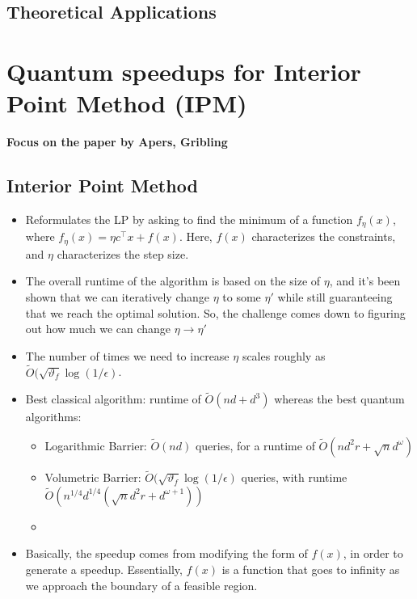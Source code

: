 \documentclass[10pt]{article}
\renewcommand{\tilde}{\widetilde}
\begin{document}
	\subsection{Theoretical Applications} 

	\section{Quantum speedups for Interior Point Method (IPM)}
	\textbf{Focus on the paper by Apers, Gribling}
	\subsection{Interior Point Method}
	\begin{itemize}
		\item Reformulates the LP by asking to find the minimum of a function \( f_{\eta}(x)  \), where 
			\( f_{\eta}(x) = \eta c^{\top}x + f(x)  \). Here, \( f(x) \) characterizes the constraints, and 
			\( \eta \) characterizes the step size. 
		\item The overall runtime of the algorithm is based on the size of \( \eta \), and it's been shown that we can 
			iteratively change \( \eta \) to some \( \eta' \) while still guaranteeing that we reach the 
			optimal solution. So, the challenge comes down to figuring out how much we can change \( \eta \to \eta' \)
		\item The number of times we need to increase  \( \eta \) scales roughly as \( \widetilde O(\sqrt{\vartheta_f} 
			\log(1 / \epsilon)\).
		\item Best classical algorithm: runtime of \( \widetilde  O(nd + d^3) \) whereas the best quantum algorithms:
			\begin{itemize}
				\item Logarithmic Barrier: \( \tilde O(nd) \) queries, for a runtime of \( \widetilde O(nd^2 r + 
					\sqrt{n} d ^{\omega}) \)
				\item Volumetric Barrier: \( \tilde O(\sqrt{\vartheta_f} \log(1 / \epsilon) \) queries, 
					with runtime \( \tilde O(n^{1 / 4}d^{1/4} (\sqrt{n} d^2 r + d^{\omega + 1})) \) 
				\item 
			\end{itemize}
		\item Basically, the speedup comes from modifying the form of \( f(x) \), in order to generate a speedup. 
			Essentially, \( f(x) \) is a function that goes to infinity as we approach the boundary of a feasible 
			region.
	\end{itemize}
\end{document}
